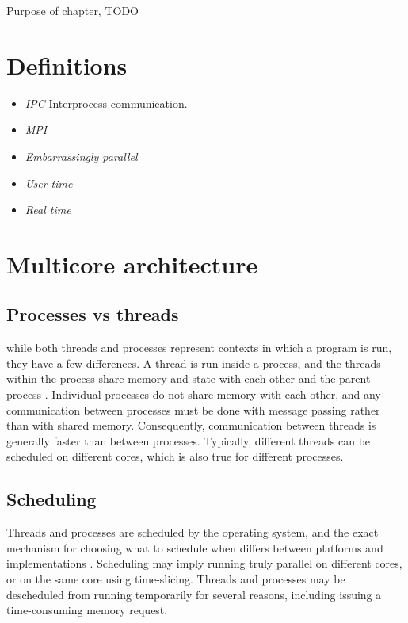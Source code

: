 Purpose of chapter, TODO

\section{Definitions}
\begin{itemize}
  \item \emph{IPC} Interprocess communication.
  \item \emph{MPI}
  \item \emph{Embarrassingly parallel}
  \item \emph{User time}
  \item \emph{Real time}
\end{itemize}

\section{Multicore architecture} %
\subsection{Processes vs threads}
while both threads and processes represent contexts in which a program is run, they have a few differences. A thread is run inside
a process, and the threads within the process share memory and state with each other and the parent
process \cite{cai_2005_performance_otpotpplfsapsc}. Individual processes do not share memory with each other, and any
communication between processes must be done with message passing rather than with shared memory. Consequently, communication
between threads is generally faster than between processes.
Typically, different threads can be scheduled on different cores, which is also true for different processes. %

\subsection{Scheduling}
Threads and processes are scheduled by the operating system, and the exact mechanism for choosing what to schedule when differs
between platforms and implementations \cite[Appendix B]{herlihy_2012_art_taomprr}. Scheduling may imply running truly parallel
on different cores, or on the same core using time-slicing. Threads and processes may be descheduled from running temporarily for several
reasons, including issuing a time-consuming memory request.

